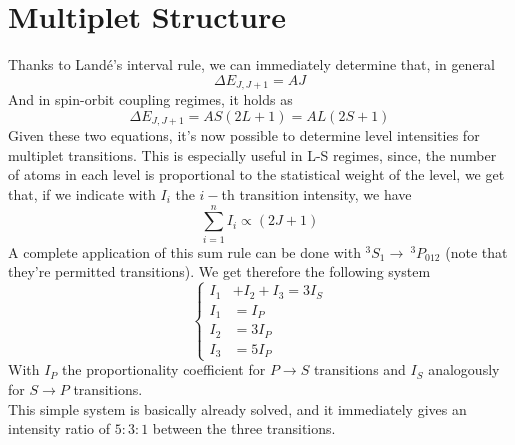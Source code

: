 \documentclass[a4paper, 11pt]{book}
\newcommand{\1}{\opr{\mathds{1}}}
\newcommand{\term}[3][]{^{#3}#2_{#1}}
\theoremstyle{plain}
\begin{document}
	\section{Multiplet Structure}
	Thanks to Landé's interval rule, we can immediately determine that, in general
	\begin{equation*}
		\Delta E_{J,J+1}=AJ
	\end{equation*}
	And in spin-orbit coupling regimes, it holds as
	\begin{equation*}
		\Delta E_{J,J+1}=AS(2L+1)=AL(2S+1)
	\end{equation*}
	Given these two equations, it's now possible to determine level intensities for multiplet transitions. This is especially useful in L-S regimes, since, the number of atoms in each level is proportional to the statistical weight of the level, we get that, if we indicate with $I_i$ the $i-$th transition intensity, we have
	\begin{equation}
		\sum_{i=1}^nI_i\propto(2J+1)
		\label{eq:intensitysumrule}
	\end{equation}
	A complete application of this sum rule can be done with $\term[1]{S}{3}\to\ \term[012]{P}{3}$ (note that they're permitted transitions). We get therefore the following system
	\begin{equation}
		\left\{
			\begin{aligned}
				I_1&+I_2+I_3=3I_S\\
				I_1&=I_P\\
				I_2&=3I_P\\
				I_3&=5I_P
			\end{aligned}
		\right.
		\label{eq:simplesystem}
	\end{equation}
	With $I_P$ the proportionality coefficient for $P\to S$ transitions and $I_S$ analogously for $S\to P$ transitions.\\
	This simple system is basically already solved, and it immediately gives an intensity ratio of $5:3:1$ between the three transitions.\\
\end{document}

